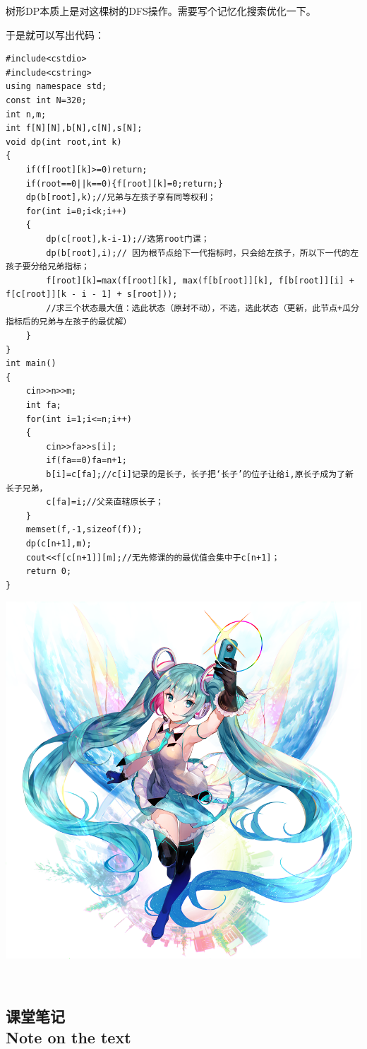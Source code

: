 \documentclass{article}
\theoremstyle{nonumberplain}
\newcommand{\note}{\ \par
	\subsection*{课堂笔记\\\tiny{Note on the text}}
	\newpage}
\begin{document}
树形DP本质上是对这棵树的DFS操作。需要写个记忆化搜索优化一下。

于是就可以写出代码：

\begin{verbatim}
#include<cstdio>
#include<cstring>
using namespace std;
const int N=320;
int n,m;
int f[N][N],b[N],c[N],s[N];
void dp(int root,int k)
{
    if(f[root][k]>=0)return;
    if(root==0||k==0){f[root][k]=0;return;}
    dp(b[root],k);//兄弟与左孩子享有同等权利；
    for(int i=0;i<k;i++)
    {
        dp(c[root],k-i-1);//选第root门课； 
        dp(b[root],i);// 因为根节点给下一代指标时，只会给左孩子，所以下一代的左孩子要分给兄弟指标；
        f[root][k]=max(f[root][k], max(f[b[root]][k], f[b[root]][i] + f[c[root]][k - i - 1] + s[root]));
        //求三个状态最大值：选此状态（原封不动），不选，选此状态（更新，此节点+瓜分指标后的兄弟与左孩子的最优解） 
    }
}
int main()
{
    cin>>n>>m;
    int fa;
    for(int i=1;i<=n;i++)
    {
        cin>>fa>>s[i];
        if(fa==0)fa=n+1; 
        b[i]=c[fa];//c[i]记录的是长子，长子把‘长子’的位子让给i,原长子成为了新长子兄弟， 
        c[fa]=i;//父亲直辖原长子； 
    }
    memset(f,-1,sizeof(f));
    dp(c[n+1],m);
    cout<<f[c[n+1]][m];//无先修课的的最优值会集中于c[n+1]； 
    return 0;
}
\end{verbatim}
\begin{center}\includegraphics[scale=1.75]{64304330_p0.png}\end{center}
\note
\end{document}
